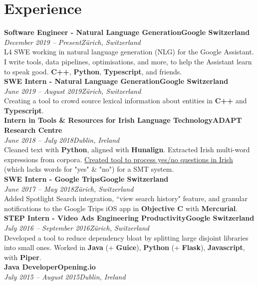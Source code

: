 \documentclass[a4paper, oneside, final]{scrartcl}
\newcommand{\nasc}[2]{\href{#1}{\color{blue}\setulcolor{blue}\ul{#2}}}
\newcommand{\bearna}[0]{\vspace{2.25mm}\\}
\newcommand{\fmtdate}[1]{\textit{#1}}
\newcommand{\fmtaddress}[1]{\textit{#1}}
\newcommand{\fmtjobtitle}[1]{\textbf{#1}}
\newcommand{\fmtskill}[1]{\textbf{#1}}
\begin{document}
\section{Experience}
\fmtjobtitle{Software Engineer - Natural Language Generation\hfill Google Switzerland}\\
\fmtdate{December 2019 -- Present}\hfill\fmtaddress{Zürich, Switzerland}\\
L4 SWE working in natural language generation (NLG) for the Google Assistant. I write tools, data pipelines, optimisations, and more, to help the Assistant learn to speak good. \fmtskill{C++}, \fmtskill{Python}, \fmtskill{Typescript}, and friends.
\bearna
\fmtjobtitle{SWE Intern - Natural Language Generation\hfill Google Switzerland}\\
\fmtdate{June 2019 -- August 2019}\hfill\fmtaddress{Zürich, Switzerland}\\
Creating a tool to crowd source lexical information about entities in \fmtskill{C++} and \fmtskill{Typescript}.
\bearna
\fmtjobtitle{Intern in Tools \& Resources for Irish Language Technology\hfill ADAPT Research Centre}\\
\fmtdate{June 2018 -- July 2018}\hfill\fmtaddress{Dublin, Ireland}\\
Cleaned text with \fmtskill{Python}, aligned with \fmtskill{Hunalign}. Extracted Irish multi-word expressions from corpora. \nasc{http://mycode.doesnot.run/2018/08/15/yes-no/}{Created tool to process yes/no questions in Irish} (which lacks words for "yes" \& "no") for a SMT system.
\bearna
\fmtjobtitle{SWE Intern - Google Trips\hfill Google Switzerland}\\
\fmtdate{June 2017 -- May 2018}\hfill\fmtaddress{Zürich, Switzerland}\\
Added Spotlight Search integration, ``view search history" feature, and granular notifications to the Google Trips iOS app in \fmtskill{Objective C} with \fmtskill{Mercurial}.
\bearna
\fmtjobtitle{STEP Intern - Video Ads Engineering Productivity\hfill Google Switzerland}\\
\fmtdate{July 2016 -- September 2016}\hfill\fmtaddress{Zürich, Switzerland}\\
Developed a tool to reduce dependency bloat by splitting large disjoint libraries into small ones. Worked in \fmtskill{Java} (+ \fmtskill{Guice}), \fmtskill{Python} (+ \fmtskill{Flask}), \fmtskill{Javascript}, with \fmtskill{Piper}.
\bearna
\fmtjobtitle{Java Developer\hfill Opening.io}\\
\fmtdate{July 2015 -- August 2015}\hfill\fmtaddress{Dublin, Ireland}\\
\end{document}

